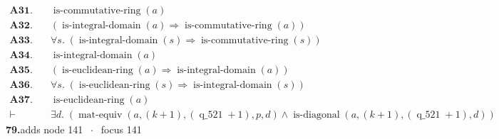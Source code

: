 \documentclass[11pt]{article}
\theoremstyle{plain}
\newcommand{\fit}[1]{\resizebox{\ifdim\width>\linewidth\linewidth\else\width\fi}{!}{#1}}
\begin{document}
\begin{align*}
  \mathbf{A31.}\quad & \operatorname{is\text{-}commutative\text{-}ring}(a) \\
  \mathbf{A32.}\quad & (\operatorname{is\text{-}integral\text{-}domain}(a) \Rightarrow \operatorname{is\text{-}commutative\text{-}ring}(a)) \\
  \mathbf{A33.}\quad & \forall s.\; (\operatorname{is\text{-}integral\text{-}domain}(s) \Rightarrow \operatorname{is\text{-}commutative\text{-}ring}(s)) \\
  \mathbf{A34.}\quad & \operatorname{is\text{-}integral\text{-}domain}(a) \\
  \mathbf{A35.}\quad & (\operatorname{is\text{-}euclidean\text{-}ring}(a) \Rightarrow \operatorname{is\text{-}integral\text{-}domain}(a)) \\
  \mathbf{A36.}\quad & \forall s.\; (\operatorname{is\text{-}euclidean\text{-}ring}(s) \Rightarrow \operatorname{is\text{-}integral\text{-}domain}(s)) \\
  \mathbf{A37.}\quad & \operatorname{is\text{-}euclidean\text{-}ring}(a) \\
  \vdash\quad & \exists d.\; (\operatorname{mat\text{-}equiv}(a, (k + 1), (\operatorname{q\_521} + 1), p, d) \wedge \operatorname{is\text{-}diagonal}(a, (k + 1), (\operatorname{q\_521} + 1), d))
\end{align*}
\medskip\noindent\textbf{79.}\quad \fit{\texttt{(ai 1)}}\hfill{\small adds node 141 $\;\cdot\;$ focus 141}\\[2pt]
\end{document}
